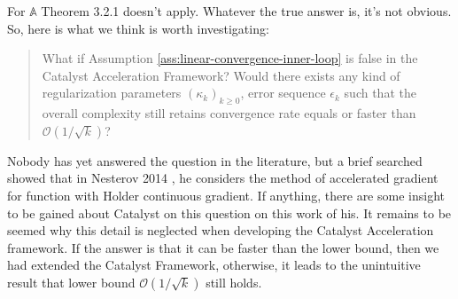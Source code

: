 \documentclass[12pt]{article}
\begin{document}
            For $\mathbb A$ Theorem 3.2.1 doesn't apply. 
            Whatever the true answer is, it's not obvious. 
            So, here is what we think is worth investigating: 
            \begin{quotation}
                What if Assumption \ref{ass:linear-convergence-inner-loop} is false in the Catalyst Acceleration Framework? 
                Would there exists any kind of regularization parameters $(\kappa_k)_{k \ge 0}$, error sequence $\epsilon_k$ such that the overall complexity still retains convergence rate equals or faster than $\mathcal O(1/\sqrt{k})$? 
            \end{quotation}
            Nobody has yet answered the question in the literature, but a brief searched showed that in Nesterov 2014 \cite{nesterov_universal_2015}, he considers the method of accelerated gradient for function with Holder continuous gradient. 
            If anything, there are some insight to be gained about Catalyst on this question on this work of his. 
            It remains to be seemed why this detail is neglected when developing the Catalyst Acceleration framework. 
            If the answer is that it can be faster than the lower bound, then we had extended the Catalyst Framework, otherwise, it leads to the unintuitive result that lower bound $\mathcal O(1/\sqrt{k})$ still holds. 




    







\newpage

\appendix
\end{document}
